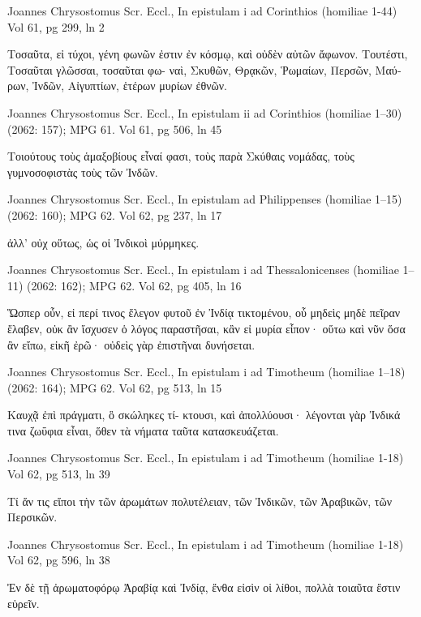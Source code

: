 \documentclass[12pt,letterpaper,twoside,final]{memoir}
\begin{document}
\begin{greek}
Joannes Chrysostomus Scr. Eccl., In epistulam i ad Corinthios (homiliae 1-44) 
Vol 61, pg 299, ln 2

                                     Τοσαῦτα, εἰ τύχοι, 
γένη φωνῶν ἐστιν ἐν κόσμῳ, καὶ οὐδὲν αὐτῶν 
ἄφωνον. Τουτέστι, Τοσαῦται γλῶσσαι, τοσαῦται φω-  
ναὶ, Σκυθῶν, Θρᾳκῶν, Ῥωμαίων, Περσῶν, Μαύρων, 
Ἰνδῶν, Αἰγυπτίων, ἑτέρων μυρίων ἐθνῶν. 



Joannes Chrysostomus Scr. Eccl., In epistulam ii ad Corinthios (homiliae 1–30) (2062: 157); MPG 61.
Vol 61, pg 506, ln 45

Τοιούτους τοὺς ἁμαξοβίους εἶναί φασι, τοὺς 
παρὰ Σκύθαις νομάδας, τοὺς γυμνοσοφιστὰς τοὺς 
τῶν Ἰνδῶν. 



Joannes Chrysostomus Scr. Eccl., In epistulam ad Philippenses (homiliae 1–15) (2062: 160); MPG 62.
Vol 62, pg 237, ln 17

                                         ἀλλ' οὐχ οὕτως, 
ὡς οἱ Ἰνδικοὶ μύρμηκες. 



Joannes Chrysostomus Scr. Eccl., In epistulam i ad Thessalonicenses (homiliae 1–11) (2062: 162); MPG 62.
Vol 62, pg 405, ln 16

Ὥσπερ οὖν, εἰ περί τινος ἔλεγον φυτοῦ ἐν Ἰνδίᾳ 
τικτομένου, οὗ μηδεὶς μηδὲ πεῖραν ἔλαβεν, οὐκ ἂν 
ἴσχυσεν ὁ λόγος παραστῆσαι, κἂν εἰ μυρία εἶπον· 
οὕτω καὶ νῦν ὅσα ἂν εἴπω, εἰκῆ ἐρῶ· οὐδεὶς γὰρ 
ἐπιστῆναι δυνήσεται. 



Joannes Chrysostomus Scr. Eccl., In epistulam i ad Timotheum (homiliae 1–18) (2062: 164); MPG 62.
Vol 62, pg 513, ln 15

             Καυχᾷ ἐπὶ πράγματι, ὃ σκώληκες τί-
κτουσι, καὶ ἀπολλύουσι· λέγονται γὰρ Ἰνδικά τινα 
ζωΰφια εἶναι, ὅθεν τὰ νήματα ταῦτα κατασκευάζεται. 



Joannes Chrysostomus Scr. Eccl., In epistulam i ad Timotheum (homiliae 1-18) 
Vol 62, pg 513, ln 39

Τί ἄν τις εἴποι τὴν τῶν ἀρωμάτων πολυτέλειαν, τῶν 
Ἰνδικῶν, τῶν Ἀραβικῶν, τῶν Περσικῶν. 



Joannes Chrysostomus Scr. Eccl., In epistulam i ad Timotheum (homiliae 1-18) 
Vol 62, pg 596, ln 38

                                                     Ἐν δὲ 
τῇ ἀρωματοφόρῳ Ἀραβίᾳ καὶ Ἰνδίᾳ, ἔνθα εἰσὶν οἱ 
λίθοι, πολλὰ τοιαῦτα ἔστιν εὑρεῖν. 




\end{greek}
\end{document}
